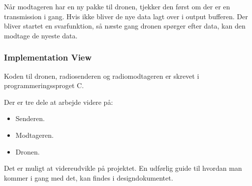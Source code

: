 \documentclass[Main]{subfiles}
\begin{document}
Når modtageren har en ny pakke til dronen, tjekker den først om der er en \itoc transmission i gang. Hvis ikke bliver de nye data lagt over i output bufferen. Der bliver startet en svarfunktion, så næste gang dronen spørger efter data, kan den modtage de nyeste data.

\subsubsection*{Implementation View}
Koden til dronen, radiosenderen og radiomodtageren er skrevet i programmeringssproget C.

Der er tre dele at arbejde videre på:
\vspace{-20pt}
\begin{itemize}
\item Senderen.
\item Modtageren.
\item Dronen.
\end{itemize}

Det er muligt at videreudvikle på projektet.
En udførlig guide til hvordan man kommer i gang med det, kan findes i  designdokumentet\cite[afs. 2.4]{Design}.
\end{document}
